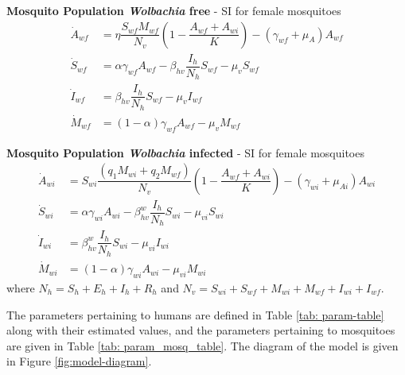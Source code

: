\documentclass{ws-rv9x6}
\begin{document}

\noindent \textbf{Mosquito Population \textit{Wolbachia} free} - SI for female mosquitoes
\begin{align}
    \label{eq:5}\dot{A}_{wf} & = \eta \dfrac{S_{wf}M_{wf}}{N_v}\left(1-\dfrac{A_{wf}+A_{wi}}{K}\right)-(\gamma_{wf}+\mu_A)A_{wf}\\
    \label{eq:6}\dot{S}_{wf} & = \alpha \gamma_{wf}A_{wf}-\beta_{hv}\dfrac{I_h}{N_h}S_{wf}-\mu_v S_{wf}\\
    \label{eq:7}\dot{I}_{wf} & = \beta_{hv}\dfrac{I_h}{N_h}S_{wf}-\mu_v I_{wf}\\
    \label{eq:8}\dot{M}_{wf} & = (1-\alpha)\gamma_{wf}A_{wf}-\mu_vM_{wf}   
\end{align}



\noindent \textbf{Mosquito Population \textit{Wolbachia} infected} - SI for female mosquitoes
\begin{align}
    \label{eq:9}\dot{A}_{wi} & =  S_{wi}\dfrac{(q_1M_{wi}+q_2M_{wf})}{N_v}\left(1-\dfrac{A_{wf}+A_{wi}}{K}\right)-(\gamma_{wi}+\mu_{Ai})A_{wi}\\ 
    \label{eq:10}\dot{S}_{wi} & = \alpha \gamma_{wi}A_{wi} -\beta^w_{hv}\dfrac{I_h}{N_h}S_{wi}-\mu_{vi} S_{wi}\\ 
    \label{eq:11}\dot{I}_{wi} & = \beta^w_{hv}\dfrac{I_h}{N_h}S_{wi}-\mu_{vi} I_{wi}\\ 
    \label{eq:12}\dot{M}_{wi} & =  (1-\alpha)\gamma_{wi} A_{wi} -\mu_{vi}M_{wi}
\end{align}
where $N_h=S_h+E_h+I_h+R_h$ and $N_v=S_{wi}+S_{wf}+M_{wi}+M_{wf}+I_{wi}+I_{wf}.$

The parameters pertaining to humans are defined in Table \ref{tab: param-table} along with their estimated values, and the parameters pertaining to mosquitoes are given in Table \ref{tab: param_mosq_table}. The diagram of the model is given in Figure \ref{fig:model-diagram}.
\end{document}
